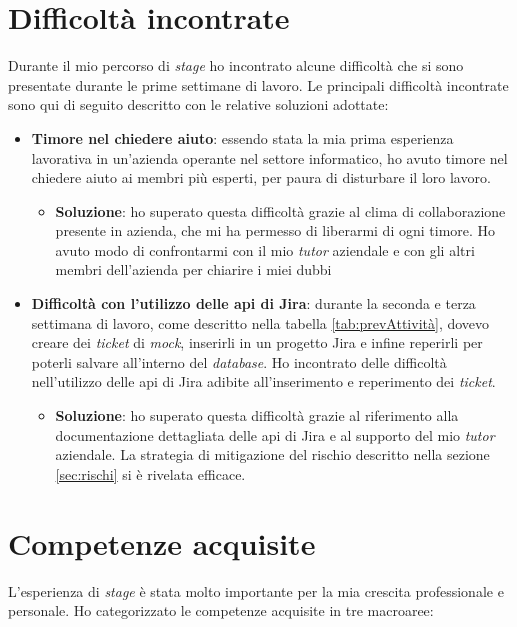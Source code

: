 \section{Difficoltà incontrate}
Durante il mio percorso di \textit{stage} ho incontrato alcune difficoltà che si sono presentate durante le prime settimane di lavoro. Le principali difficoltà incontrate sono qui di seguito descritto con le relative soluzioni adottate:
\begin{itemize}
    \item \textbf{Timore nel chiedere aiuto}: essendo stata la mia prima esperienza lavorativa in un'azienda operante nel settore informatico, ho avuto timore nel chiedere aiuto ai membri più esperti, per paura di disturbare il loro lavoro. 
        \begin{itemize} 
        \item \textbf{Soluzione}: ho superato questa difficoltà grazie al clima di collaborazione presente in azienda, che mi ha permesso di liberarmi di ogni timore. Ho avuto modo di confrontarmi con il mio \textit{tutor} aziendale e con gli altri membri dell'azienda per chiarire i miei dubbi
        \end{itemize}
    \item \textbf{Difficoltà con l'utilizzo delle \gls{api} di Jira}: durante la seconda e terza settimana di lavoro, come descritto nella tabella \ref{tab:prevAttività}, dovevo creare dei \textit{ticket} di \textit{mock}, inserirli in un progetto Jira e infine reperirli per poterli salvare all'interno del \textit{database}. Ho incontrato delle difficoltà nell'utilizzo delle \gls{api} di Jira adibite all'inserimento e reperimento dei \textit{ticket}. \begin{itemize} \item \textbf{Soluzione}: ho superato questa difficoltà grazie al riferimento alla documentazione dettagliata delle \gls{api} di Jira e al supporto del mio \textit{tutor} aziendale. La strategia di mitigazione del rischio descritto nella sezione \ref{sec:rischi} si è rivelata efficace. \end{itemize}
\end{itemize}

\section{Competenze acquisite}
L'esperienza di \textit{stage} è stata molto importante per la mia crescita professionale e personale. Ho categorizzato le competenze acquisite in tre macroaree:


